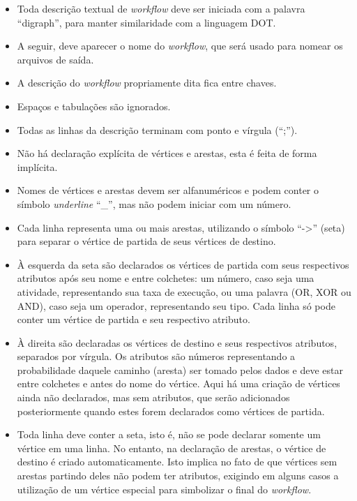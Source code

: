 \documentclass[a4paper,11pt]{article}
\begin{document}
  		\begin{itemize}
  			\item Toda descrição textual de \emph{workflow} deve ser iniciada com a palavra ``digraph'', para manter similaridade com a linguagem DOT.
  			\item A seguir, deve aparecer o nome do \emph{workflow}, que será usado para nomear os arquivos de saída.
  			\item A descrição do \emph{workflow} propriamente dita fica entre chaves.
  			\item Espaços e tabulações são ignorados.
  			\item Todas as linhas da descrição terminam com ponto e vírgula (``;'').
  			\item Não há declaração explícita de vértices e arestas, esta é feita de forma implícita.
  			\item Nomes de vértices e arestas devem ser alfanuméricos e podem conter o símbolo \emph{underline} ``\_'', mas não podem iniciar com um número.
  			\item Cada linha representa uma ou mais arestas, utilizando o símbolo ``->'' (seta) para separar o vértice de partida de seus vértices de destino.
  			\item À esquerda da seta são declarados os vértices de partida com seus respectivos atributos após seu nome e entre colchetes: um número, caso seja uma atividade, representando sua taxa de execução, ou uma palavra (OR, XOR ou AND), caso seja um operador, representando seu tipo. Cada linha só pode conter um vértice de partida e seu respectivo atributo.
  			\item À direita são declaradas os vértices de destino e seus respectivos atributos, separados por vírgula. Os atributos são números representando a probabilidade daquele caminho (aresta) ser tomado pelos dados e deve estar entre colchetes e antes do nome do vértice. Aqui há uma criação de vértices ainda não declarados, mas sem atributos, que serão adicionados posteriormente quando estes forem declarados como vértices de partida.
  			\item Toda linha deve conter a seta, isto é, não se pode declarar somente um vértice em uma linha. No entanto, na declaração de arestas, o vértice de destino é criado automaticamente. Isto implica no fato de que vértices sem arestas partindo deles não podem ter atributos, exigindo em alguns casos a utilização de um vértice especial para simbolizar o final do \emph{workflow}.
  		\end{itemize}
  
\end{document}

